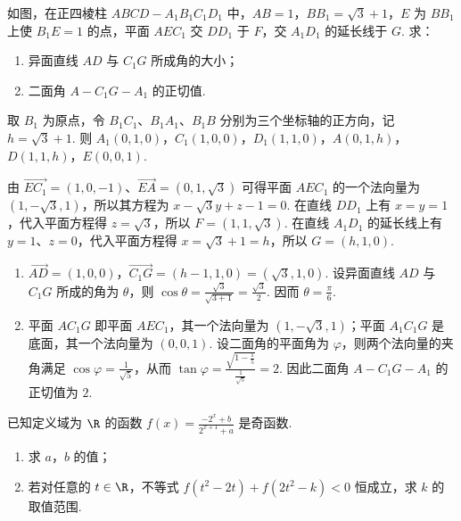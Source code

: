 \begin{problem}
如图，在正四棱柱 \(ABCD - A_{1}B_{1}C_{1}D_{1}\) 中，\(AB = 1\)，\(BB_{1} = \sqrt{3} + 1\)，\(E\) 为 \(BB_{1}\) 上使 \(B_{1}E = 1\) 的点，平面 \(AEC_{1}\) 交 \(DD_{1}\) 于 \(F\)，交 \(A_{1}D_{1}\) 的延长线于 \(G\). 求：

\begin{enumerate}
\item 异面直线 \(AD\) 与 \(C_{1}G\) 所成角的大小；
\item 二面角 \(A - C_{1}G - A_{1}\) 的正切值.
\end{enumerate}

\end{problem}

\begin{solution}
取 \(B_{1}\) 为原点，令 \(B_{1}C_{1}\)、\(B_{1}A_{1}\)、\(B_{1}B\) 分别为三个坐标轴的正方向，记 \(h=\sqrt{3}+1\). 则 \(A_{1}(0,1,0)\)，\(C_{1}(1,0,0)\)，\(D_{1}(1,1,0)\)，\(A(0,1,h)\)，\(D(1,1,h)\)，\(E(0,0,1)\).

由 \(\overrightarrow{EC_{1}}=(1,0,-1)\)、\(\overrightarrow{EA}=(0,1,\sqrt{3})\) 可得平面 \(AEC_{1}\) 的一个法向量为 \((1,-\sqrt{3},1)\)，所以其方程为 \(x-\sqrt{3}y+z-1=0\). 在直线 \(DD_{1}\) 上有 \(x=y=1\)，代入平面方程得 \(z=\sqrt{3}\)，所以 \(F=(1,1,\sqrt{3})\). 在直线 \(A_{1}D_{1}\) 的延长线上有 \(y=1\)、\(z=0\)，代入平面方程得 \(x=\sqrt{3}+1=h\)，所以 \(G=(h,1,0)\).

\begin{enumerate}
\item \(\overrightarrow{AD}=(1,0,0)\)，\(\overrightarrow{C_{1}G}=(h-1,1,0)=(\sqrt{3},1,0)\). 设异面直线 \(AD\) 与 \(C_{1}G\) 所成的角为 \(\theta\)，则 \(\cos\theta=\frac{\sqrt{3}}{\sqrt{3+1}}=\frac{\sqrt{3}}{2}\). 因而 \(\theta=\frac{\pi}{6}\).
\item 平面 \(AC_{1}G\) 即平面 \(AEC_{1}\)，其一个法向量为 \((1,-\sqrt{3},1)\)；平面 \(A_{1}C_{1}G\) 是底面，其一个法向量为 \((0,0,1)\). 设二面角的平面角为 \(\varphi\)，则两个法向量的夹角满足 \(\cos\varphi=\frac{1}{\sqrt{5}}\)，从而 \(\tan\varphi=\frac{\sqrt{1-\frac{1}{5}}}{\frac{1}{\sqrt{5}}}=2\). 因此二面角 \(A-C_{1}G-A_{1}\) 的正切值为 \(2\).
\end{enumerate}
\end{solution}

\begin{problem}
已知定义域为 \(\R\) 的函数 \(f(x) = \frac{-2^x + b}{2^{x + 1} + a}\) 是奇函数.

\begin{enumerate}
\item 求 \(a\)，\(b\) 的值；
\item 若对任意的 \(t \in \R\)，不等式 \(f(t^2 - 2t) + f(2t^2 - k) < 0\) 恒成立，求 \(k\) 的取值范围.
\end{enumerate}
\end{problem}

